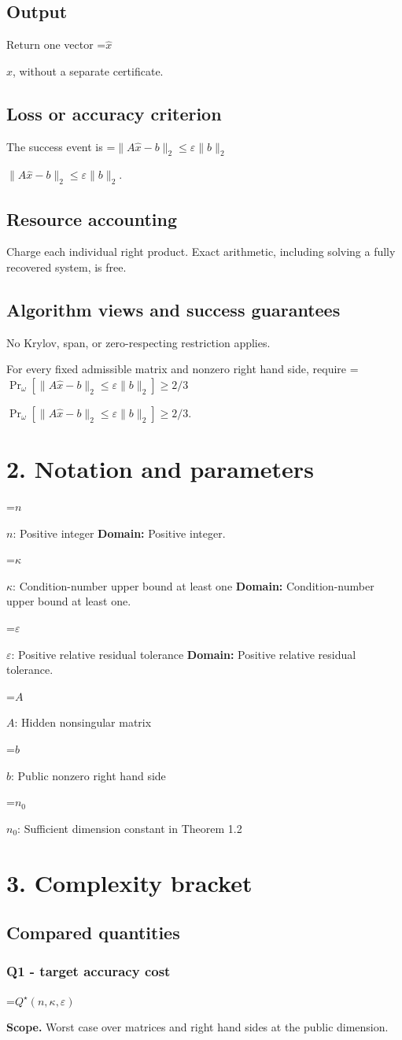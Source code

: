 \documentclass[10pt,a4paper]{article}
\newcommand{\AtlasMath}[1]{\par\begingroup\centering\setbox0=\hbox{$\displaystyle #1$}\ifdim\wd0>1.4\linewidth\typeout{ATLAS WIDE FORMULA: \the\wd0}\fi\ifdim\wd0>\linewidth\resizebox{\linewidth}{!}{\box0}\else\box0\fi\par\endgroup}
\newcommand{\AtlasInlineMath}[1]{\begingroup\setbox0=\hbox{$#1$}\ifdim\wd0>.4\linewidth\endgroup\AtlasMath{#1}\else\endgroup$#1$\fi}
\begin{document}
\subsection{Output}
Return one vector \AtlasInlineMath{\widehat x}, without a separate certificate.

\subsection{Loss or accuracy criterion}
The success event is \AtlasInlineMath{\|A\widehat x-b\|_2\le\varepsilon\|b\|_2}.

\subsection{Resource accounting}
Charge each individual right product. Exact arithmetic, including solving a fully recovered system, is free.

\subsection{Algorithm views and success guarantees}
No Krylov, span, or zero-respecting restriction applies.

For every fixed admissible matrix and nonzero right hand side, require \AtlasInlineMath{\Pr_\omega[\|A\widehat x-b\|_2\le\varepsilon\|b\|_2]\ge 2/3}.

\section{2. Notation and parameters}
\AtlasInlineMath{n}: Positive integer \textbf{Domain:} Positive integer.

\AtlasInlineMath{\kappa}: Condition-number upper bound at least one \textbf{Domain:} Condition-number upper bound at least one.

\AtlasInlineMath{\varepsilon}: Positive relative residual tolerance \textbf{Domain:} Positive relative residual tolerance.

\AtlasInlineMath{A}: Hidden nonsingular matrix

\AtlasInlineMath{b}: Public nonzero right hand side

\AtlasInlineMath{n_0}: Sufficient dimension constant in Theorem 1.2

\section{3. Complexity bracket}
\subsection{Compared quantities}
\subsubsection{Q1 - target accuracy cost}
\AtlasMath{Q^\star(n,\kappa,\varepsilon)}
\textbf{Scope.} Worst case over matrices and right hand sides at the public dimension.
\end{document}
